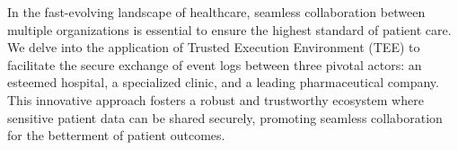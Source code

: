In the fast-evolving landscape of healthcare, seamless collaboration between multiple organizations is essential to ensure the highest standard of patient care. We delve into the application of Trusted Execution Environment (TEE) to facilitate the secure exchange of event logs between three pivotal actors: an esteemed hospital, a specialized clinic, and a leading pharmaceutical company. This innovative approach fosters a robust and trustworthy ecosystem where sensitive patient data can be shared securely, promoting seamless collaboration for the betterment of patient outcomes.
